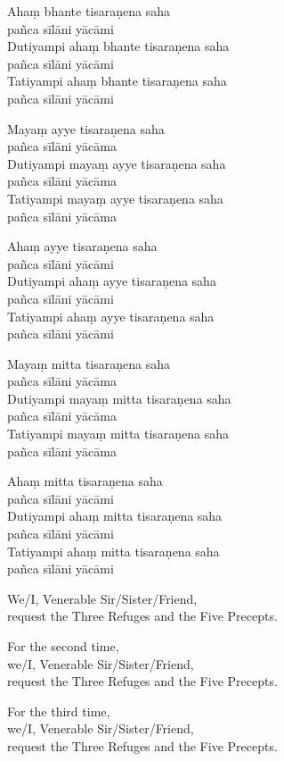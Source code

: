 
Ahaṃ bhante tisaraṇena saha\\\vin pañca sīlāni yācāmi\\
Dutiyampi ahaṃ bhante tisaraṇena saha\\\vin pañca sīlāni yācāmi\\
Tatiyampi ahaṃ bhante tisaraṇena saha\\\vin pañca sīlāni yācāmi


Mayaṃ ayye tisaraṇena saha\\\vin pañca sīlāni yācāma\\
Dutiyampi mayaṃ ayye tisaraṇena saha\\\vin pañca sīlāni yācāma\\
Tatiyampi mayaṃ ayye tisaraṇena saha\\\vin pañca sīlāni yācāma


Ahaṃ ayye tisaraṇena saha\\\vin pañca sīlāni yācāmi\\
Dutiyampi ahaṃ ayye tisaraṇena saha\\\vin pañca sīlāni yācāmi\\
Tatiyampi ahaṃ ayye tisaraṇena saha\\\vin pañca sīlāni yācāmi


Mayaṃ mitta tisaraṇena saha\\\vin pañca sīlāni yācāma\\
Dutiyampi mayaṃ mitta tisaraṇena saha\\\vin pañca sīlāni yācāma\\
Tatiyampi mayaṃ mitta tisaraṇena saha\\\vin pañca sīlāni yācāma

\ifhandbookedition
\enlargethispage{\baselineskip}
\fi


Ahaṃ mitta tisaraṇena saha\\\vin pañca sīlāni yācāmi\\
Dutiyampi ahaṃ mitta tisaraṇena saha\\\vin pañca sīlāni yācāmi\\
Tatiyampi ahaṃ mitta tisaraṇena saha\\\vin pañca sīlāni yācāmi

\begin{english}
  We/I, Venerable Sir/Sister/Friend,\\
  request the Three Refuges and the Five Precepts.

  For the second time,\\
  we/I, Venerable Sir/Sister/Friend,\\
  request the Three Refuges and the Five Precepts.

  For the third time,\\
  we/I, Venerable Sir/Sister/Friend,\\
  request the Three Refuges and the Five Precepts.
\end{english}

